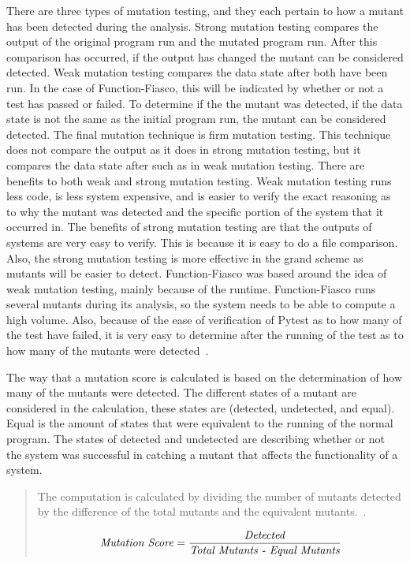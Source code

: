 There are three types of mutation testing, and they each pertain to how a mutant has been detected during the analysis. Strong mutation testing compares the output of the original program run and the mutated program run. After this comparison has occurred, if the output has changed the mutant can be considered detected. Weak mutation testing compares the data state after both have been run. In the case of Function-Fiasco, this will be indicated by whether or not a test has passed or failed. To determine if the the mutant was detected, if the data state is not the same as the initial program run, the mutant can be considered detected. The final mutation technique is firm mutation testing. This technique does not compare the output as it does in strong mutation testing, but it compares the data state after such as in weak mutation testing. There are benefits to both weak and strong mutation testing. Weak mutation testing runs less code, is less system expensive, and is easier to verify the exact reasoning as to why the mutant was detected and the specific portion of the system that it occurred in. The benefits of strong mutation testing are that the outputs of systems are very easy to verify. This is because it is easy to do a file comparison. Also, the strong mutation testing is more effective in the grand scheme as mutants will be easier to detect. Function-Fiasco was based around the idea of weak mutation testing, mainly because of the runtime. Function-Fiasco runs several mutants during its analysis, so the system needs to be able to compute a high volume. Also, because of the ease of verification of Pytest as to how many of the test have failed, it is very easy to determine after the running of the test as to how many of the mutants were detected~\cite{friedman_voas_1995}.

The way that a mutation score is calculated is based on the determination of how many of the mutants were detected. The different states of a mutant are considered in the calculation, these states are (detected, undetected, and equal). Equal is the amount of states that were equivalent to the running of the normal program. The states of detected and undetected are describing whether or not the system was successful in catching a mutant that affects the functionality of a system.

\begin{quote}
The computation is calculated by dividing the number of mutants detected by the difference of the total mutants and the equivalent mutants.~\cite{malaiya2002software}.

\begin{equation}
\mbox{\emph{Mutation Score}} = \frac{\mbox{\emph{Detected}}}{\mbox{\emph{Total Mutants - Equal Mutants}}}
\end{equation}
\end{quote}

